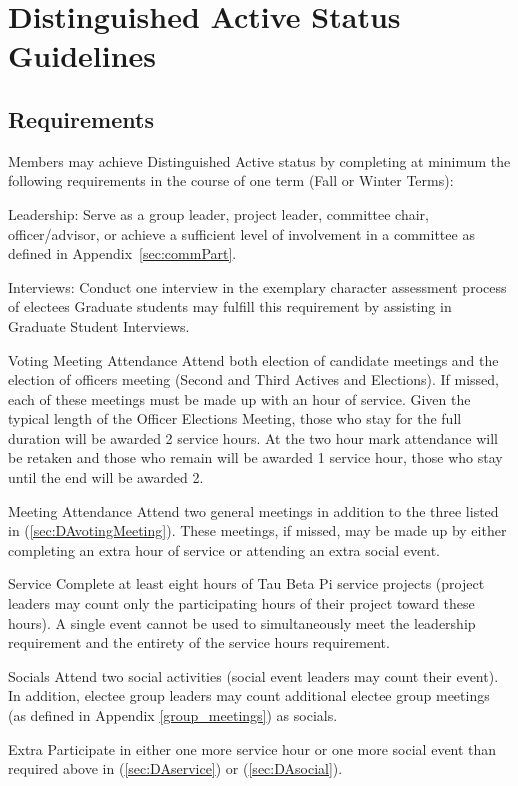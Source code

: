 \chapter{Distinguished Active Status Guidelines}\label{sec:DAstatus}
\section{Requirements} Members may achieve Distinguished Active status by completing at minimum the following requirements in the course of one term (Fall or Winter Terms):
\begin{enumsubsection}
\item{Leadership:} Serve as a group leader, project leader, committee chair,  officer/advisor, or achieve a sufficient level of involvement in a committee as defined in Appendix~\ref{sec:commPart}.
\item{Interviews:} Conduct one interview in the exemplary character assessment process of electees  Graduate students may fulfill this requirement by assisting in Graduate Student Interviews.
\item{Voting Meeting Attendance}\label{sec:DAvotingMeeting} Attend both election of candidate meetings and the election of officers meeting (Second and Third Actives and Elections). If missed, each of these meetings must be made up with an hour of service. Given the typical length of the Officer Elections Meeting, those who stay for the full duration will be awarded 2 service hours. At the two hour mark attendance will be retaken and those who remain will be awarded 1 service hour, those who stay until the end will be awarded 2.
\item{Meeting Attendance} Attend two general meetings in addition to the three listed in (\ref{sec:DAvotingMeeting}). These meetings, if missed, may be made up by either completing an extra hour of service or attending an extra social event.
\item{Service}\label{sec:DAservice} Complete at least eight hours of Tau Beta Pi service projects (project leaders may count only the participating hours of their project toward these hours). A single event cannot be used to simultaneously meet the leadership requirement and the entirety of the service hours requirement.
\item{Socials} \label{sec:DAsocial}Attend two social activities (social event leaders may count their event). In addition, electee group leaders may count additional electee group meetings (as defined in Appendix \ref{group_meetings}) as socials.
\item{Extra} Participate in either one more service hour or one more social event than required above in (\ref{sec:DAservice}) or (\ref{sec:DAsocial}).

\end{enumsubsection}
